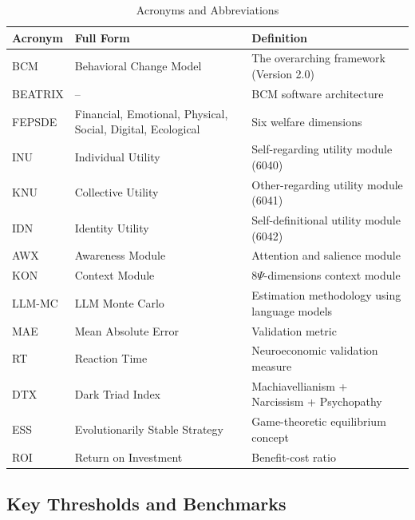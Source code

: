 \begin{longtable}{@{}lp{4cm}p{7cm}@{}}
\caption{Acronyms and Abbreviations} \\
\toprule
\textbf{Acronym} & \textbf{Full Form} & \textbf{Definition} \\
\midrule
\endfirsthead
\midrule
\endhead
\bottomrule
\endlastfoot

BCM & Behavioral Change Model & The overarching framework (Version 2.0) \\
BEATRIX & -- & BCM software architecture \\
FEPSDE & Financial, Emotional, Physical, Social, Digital, Ecological & Six welfare dimensions \\
\addlinespace
INU & Individual Utility & Self-regarding utility module (6040) \\
KNU & Collective Utility & Other-regarding utility module (6041) \\
IDN & Identity Utility & Self-definitional utility module (6042) \\
AWX & Awareness Module & Attention and salience module \\
KON & Context Module & 8$\Psi$-dimensions context module \\
\addlinespace
LLM-MC & LLM Monte Carlo & Estimation methodology using language models \\
MAE & Mean Absolute Error & Validation metric \\
RT & Reaction Time & Neuroeconomic validation measure \\
\addlinespace
DTX & Dark Triad Index & Machiavellianism + Narcissism + Psychopathy \\
ESS & Evolutionarily Stable Strategy & Game-theoretic equilibrium concept \\
ROI & Return on Investment & Benefit-cost ratio \\

\end{longtable}

\subsection{Key Thresholds and Benchmarks}

